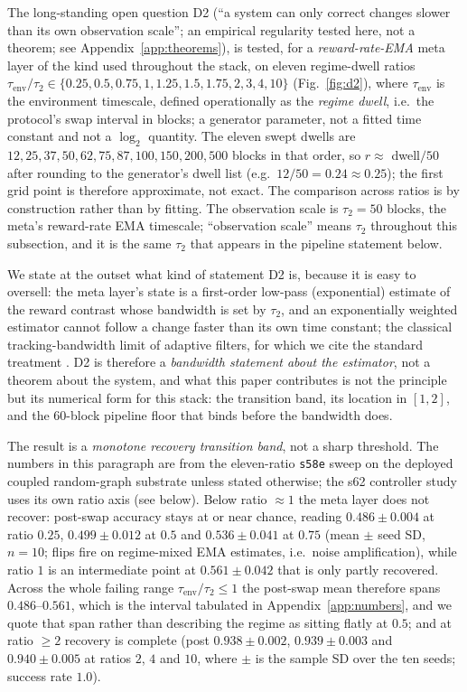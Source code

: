 \documentclass[preprint,12pt]{elsarticle}
\begin{document}
The long-standing open question D2 (``a system can only correct changes
slower than its own observation scale''; an empirical regularity tested
here, not a theorem; see Appendix~\ref{app:theorems}), is tested,
for a \emph{reward-rate-EMA} meta layer of the kind used throughout the stack,
on eleven regime-dwell ratios
$\tau_{\mathrm{env}}/\tau_2\in\{0.25,0.5,0.75,1,1.25,1.5,1.75,2,3,4,10\}$
(Fig.~\ref{fig:d2}), where
$\tau_{\mathrm{env}}$ is the environment timescale, defined operationally as
the \emph{regime dwell}, i.e.\ the protocol's swap interval in blocks; a
generator parameter, not a fitted time constant and not a $\log_2$ quantity.
The eleven swept dwells are $12,25,37,50,62,75,87,100,150,200,500$ blocks in
that order, so $r\approx$ dwell$/50$ after rounding to the generator's
dwell list (e.g.\ $12/50=0.24\approx0.25$); the first grid point is
therefore approximate, not exact. The comparison across ratios is by
construction rather than by fitting. The
observation scale is $\tau_2=50$ blocks, the meta's reward-rate EMA timescale;
``observation scale'' means $\tau_2$ throughout this subsection, and it is the
same $\tau_2$ that appears in the pipeline statement below.

We state at the
outset what kind of statement D2 is, because it is easy to oversell: the meta
layer's state is a first-order low-pass (exponential) estimate of the reward
contrast whose bandwidth is set by $\tau_2$, and an exponentially weighted
estimator cannot follow a change faster than its own time constant; the
classical tracking-bandwidth limit of adaptive filters, for which we cite the
standard treatment \cite{haykin2002}. D2 is therefore a \emph{bandwidth
statement about the estimator}, not a theorem about the system, and what this
paper contributes is not the principle but its numerical form for this stack:
the transition band, its location in $[1,2]$, and the $60$-block pipeline
floor that binds before the bandwidth does.

The result is a
\emph{monotone recovery transition band}, not a sharp threshold. The
numbers in this paragraph are from the eleven-ratio \texttt{s58e} sweep
on the deployed coupled random-graph substrate unless stated otherwise;
the s62 controller study uses its own ratio axis (see below). Below ratio
$\approx1$ the meta
layer does not recover: post-swap accuracy stays at or near chance, reading
$0.486\pm0.004$ at ratio $0.25$, $0.499\pm0.012$ at $0.5$ and
$0.536\pm0.041$ at $0.75$ (mean $\pm$ seed SD,
$n=10$; flips fire on
regime-mixed EMA estimates, i.e.\ noise amplification), while ratio $1$ is an
intermediate point at $0.561\pm0.042$ that is only partly recovered. Across
the whole failing range $\tau_{\mathrm{env}}/\tau_2\leq1$ the post-swap mean
therefore spans $0.486$--$0.561$, which is the interval tabulated in
Appendix~\ref{app:numbers}, and we quote that span rather than describing the
regime as sitting flatly at $0.5$; and at ratio $\geq2$ recovery is
complete (post $0.938\pm0.002$, $0.939\pm0.003$ and $0.940\pm0.005$ at ratios
$2$, $4$ and $10$, where $\pm$ is the sample SD over the ten seeds;
success rate $1.0$).
\end{document}
